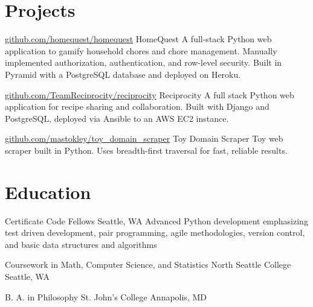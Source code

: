 \documentclass[10pt,a4paper,sans]{moderncv}        %
\begin{document}
\section{Projects}

\begin{comment}

  \cventry
  {date}
  {github url}
  {name}
  {}
  {}
  {description}

\end{comment}

{\href{https://github.com/homequest/homequest}{github.com/homequest/homequest}}
{HomeQuest} {} {} {A full-stack Python web application to gamify household
  chores and chore management. Manually implemented authorization,
  authentication, and row-level security. Built in Pyramid with a PostgreSQL
  database and deployed on Heroku.}

{\href{http://github.com/TeamReciprocity/reciprocity}{github.com/TeamReciprocity/reciprocity}}
{Reciprocity} {} {} {A full stack Python web application for recipe sharing and
  collaboration. Built with Django and PostgreSQL, deployed via Ansible to an
  AWS EC2 instance.}

{\href{https://github.com/mastokley/toy_domain_scraper}{github.com/mastokley/toy\_domain\_scraper}}
{Toy Domain Scraper} {} {} {Toy web scraper built in Python. Uses breadth-first
  traversal for fast, reliable results.}

\section{Education}
 {Certificate} {Code Fellows} {Seattle, WA} {} {Advanced Python
  development emphasizing test driven development, pair programming, agile
  methodologies, version control, and basic data structures and algorithms}

 {Coursework in Math, Computer Science, and Statistics}
{North Seattle College} {Seattle, WA} {} {}

 {B. A. in Philosophy} {St. John's College}
{Annapolis, MD} {} {}
\end{document}
